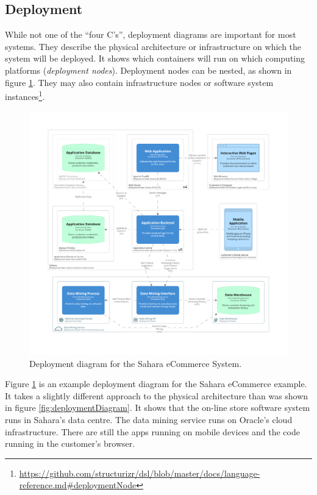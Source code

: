 \subsection{Deployment}
While not one of the ``four C's'', deployment diagrams are important for most systems.
They describe the physical architecture or infrastructure on which the system will be deployed.
It shows which containers will run on which computing platforms (\emph{deployment nodes}).
Deployment nodes can be nested, as shown in figure \ref{fig:c4_deployment}.
They may also contain infrastructure nodes or software system instances\footnote{\url{https://github.com/structurizr/dsl/blob/master/docs/language-reference.md\#deploymentNode}}.

\begin{figure}[h!]
    \centering
    \begin{adjustwidth}{-6mm}{-6mm}
        \includegraphics[trim=195 235 195 198,clip,width=0.93\paperwidth]{images/c4/deployment_diagram.png}
    \end{adjustwidth}
    \caption{Deployment diagram for the Sahara eCommerce System.}
    \label{fig:c4_deployment}
\end{figure}

\noindent
Figure \ref{fig:c4_deployment} is an example deployment diagram for the Sahara eCommerce example.
It takes a slightly different approach to the physical architecture than was shown in figure \ref{fig:deploymentDiagram}.
It shows that the on-line store software system runs in Sahara's data centre.
The data mining service runs on Oracle's cloud infrastructure.
There are still the apps running on mobile devices and the code running in the customer's browser.

